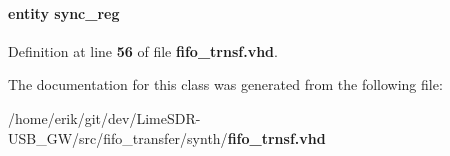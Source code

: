 \paragraph[{sync\+\_\+reg0}]{ {\bfseries \textcolor{keywordflow}{entity}\textcolor{vhdlchar}{ }\textcolor{vhdlchar}{sync\+\_\+reg}\textcolor{vhdlchar}{ }} \hspace{0.3cm}{\ttfamily [Instantiation]}}\label{classfifo__trnsf_1_1arch_a6d0f2de0bd56b397adfb1e48896e42ef}


Definition at line {\bf 56} of file {\bf fifo\+\_\+trnsf.\+vhd}.



The documentation for this class was generated from the following file\+:\begin{DoxyCompactItemize}
\item 
/home/erik/git/dev/\+Lime\+S\+D\+R-\/\+U\+S\+B\+\_\+\+G\+W/src/fifo\+\_\+transfer/synth/{\bf fifo\+\_\+trnsf.\+vhd}\end{DoxyCompactItemize}
